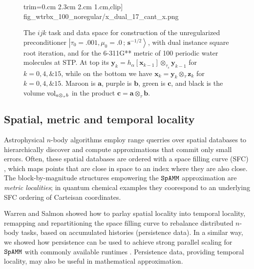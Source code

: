 \documentclass[letterpaper,twocolumn,amsmath,amsfont,amssymb,english,aps,jcp,preprintnumbers,groupaddress,nofootinbib,tightenlines,floatfix]{revtex4}
\newcommand{\mat}[1]{\boldsymbol{#1}}
\newcommand{\ot}{  {\scriptstyle \otimes}_{ \tau } }
\newcommand{\ots}{ {\scriptstyle \otimes}_{ \! \tau_s } }
\theoremstyle{plain}
\theoremstyle{remark}
\theoremstyle{plain}
\begin{document}
\begin{figure}[h]
{                        trim={0.cm 2.3cm 2.cm 1.cm},clip]
                        {fig_wtrbx_100_noregular/x_dual_17_cant_x.png}} 
\caption{
The $ijk$ task and data space for construction of the unregularized preconditioner 
$\left|\tau_0=.001,\mu_0=.0\, ; \,\scriptstyle{\mat{s}^{-1/2}} \right>$, with
dual instance square root iteration, and for the 6-311G** metric of 100 periodic water molecules
at STP.  At top its  $\mat{y}_k=h_\alpha[ \mat{x}_{k-1} ] \ots \mat{y}_{k-1}$
for $k=0,4,\& 15$, while on the bottom we have $\mat{x}_k=  \mat{y}_{k}  \ot \mat{z}_{k}$ for $k=0,4, \& 15$.
Maroon is $\mat{a}$, purple is $\mat{b}$, green is $\mat{c}$,  and black is the volume ${\rm vol}_{a \ot b}$
in the product $\mat{c}=\mat{a} \ot \mat{b}$.}\label{Lensing3}
\end{figure}

\subsection{Spatial, metric  and temporal locality}

Astrophysical $n$-body algorithms employ range querries over spatial databases to hierarchically discover 
and compute approximations that commit only small errors.  Often, these spatial databases are ordered with a 
space filling curve (SFC) \cite{}, which maps points that are close in space to an index where they are also close. 
The block-by-magnitude structures empowering the $\tt SpAMM$ approximation are {\em metric localities}; 
in quantum chemical examples they coorespond to an underlying SFC ordering of Carteisan coordinates. 

Warren and Salmon showed how to parlay spatial locality into temporal locality, 
remapping and repartitioning the space filling curve to rebalance distributed $n$-body tasks,
based on accumulated histories (persistence data).
In a similar way, we showed how persistence can be used to achieve 
strong parallel scaling for $\tt SpAMM$ with commonly available runtimes \cite{}.  
Persistence data, providing temporal locality, may also be useful in mathematical approximation.  

\end{document}
